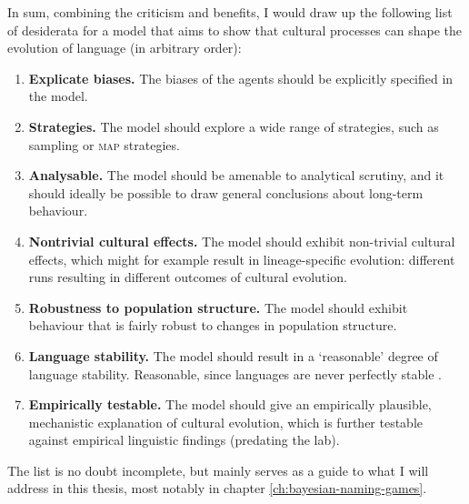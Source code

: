 \documentclass{../src/bcthesispart}
\begin{document}
\bigbreak\noindent
In sum, combining the criticism and benefits, I would draw up the following list of desiderata for a model that aims to show that cultural processes can shape the evolution of language (in arbitrary order):
\begin{enumerate}[label=(\textsc{d}\arabic*)]
	\item \textbf{Explicate biases.}
	\label{desideratum:biases}
	The biases of the agents should be explicitly specified in the model.
		
	\item \textbf{Strategies.}
	\label{desideratum:strategies}
	The model should explore a wide range of strategies, such as sampling or \textsc{map} strategies.
	
	\item\textbf{Analysable.}
	\label{desideratum:analysable}
	The model should be amenable to analytical scrutiny, and it should ideally be possible to draw general conclusions about long-term behaviour.
	
	\item \textbf{Nontrivial cultural effects.}
	\label{desideratum:cultural-effects}
	The model should exhibit non-trivial cultural effects, which might for example result in lineage-specific evolution: different runs resulting in different outcomes of cultural evolution.
	
	\item \textbf{Robustness to population structure.}
	\label{desideratum:robust}
	The model should exhibit behaviour that is fairly robust to changes in population structure.
	
	\item \textbf{Language stability.}
	\label{desideratum:stable}
	The model should result in a ‘reasonable’ degree of language stability. Reasonable, since languages are never perfectly stable \parencite[see also][]{Kirby2001}.
	
	\item \textbf{Empirically testable.}
	\label{desideratum:empirical}
	The model should give an empirically plausible, mechanistic explanation of cultural evolution, which is further testable against empirical linguistic findings (predating the lab).
\end{enumerate}
The list is no doubt incomplete, but mainly serves as a guide to what I will address in this thesis, most notably in chapter \ref{ch:bayesian-naming-games}.




\showbibliography
\end{document}
